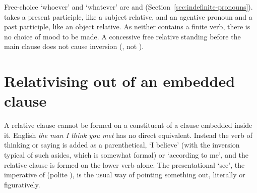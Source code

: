 Free-choice `whoever' and `whatever' are  and  (Section~\ref{sec:indefinite-pronouns}).  takes a present participle, like a subject relative, and  an agentive pronoun and a past participle, like an object relative. As neither contains a finite verb, there is no choice of mood to be made.
A concessive free relative standing before the main clause does not cause inversion (, not ).

\section{Relativising out of an embedded clause}\label{sec:relative-islands}
A relative clause cannot be formed on a constituent of a clause embedded inside it. English \textit{the man I think you met} has no direct equivalent. Instead the verb of thinking or saying is added as a parenthetical,  `I believe' (with the inversion typical of such asides, which is somewhat formal) or  `according to me', and the relative clause is formed on the lower verb alone.
The presentational  `see', the imperative of  (polite ), is the usual way of pointing something out, literally or figuratively.
